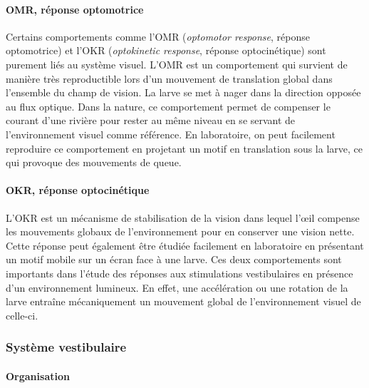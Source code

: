 \paragraph{OMR, réponse optomotrice}
Certains comportements comme l'OMR (\emph{optomotor response}, réponse optomotrice) et l'OKR (\emph{optokinetic response}, réponse optocinétique) sont purement liés au système visuel. L'OMR est un comportement qui survient de manière très reproductible lors d'un mouvement de translation global dans l'ensemble du champ de vision. La larve se met à nager dans la direction opposée au flux optique. Dans la nature, ce comportement permet de compenser le courant d'une rivière pour rester au même niveau en se servant de l'environnement visuel comme référence. En laboratoire, on peut facilement reproduire ce comportement en projetant un motif en translation sous la larve, ce qui provoque des mouvements de queue.

\paragraph{OKR, réponse optocinétique}
L'OKR est un mécanisme de stabilisation de la vision dans lequel l’œil compense les mouvements globaux de l'environnement pour en conserver une vision nette. Cette réponse peut également être étudiée facilement en laboratoire en présentant un motif mobile sur un écran face à une larve. Ces deux comportements sont importants dans l'étude des réponses aux stimulations vestibulaires en présence d'un environnement lumineux. En effet, une accélération ou une rotation de la larve entraîne mécaniquement un mouvement global de l'environnement visuel de celle-ci.

\subsubsection{Système vestibulaire}

\paragraph{Organisation}

